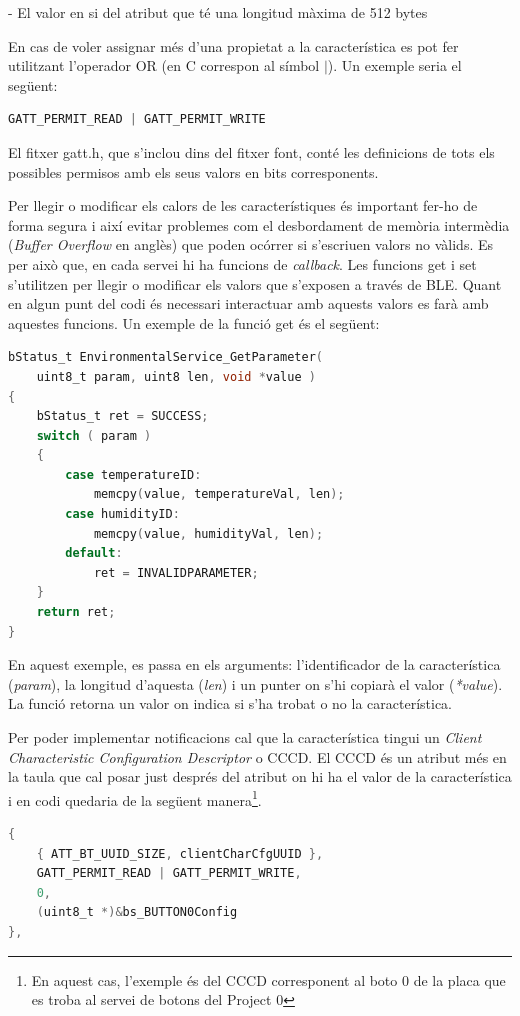 - El valor en si del atribut que té una longitud màxima de 512 bytes
\newline

En cas de voler assignar més d'una propietat a la característica es pot fer utilitzant l'operador OR (en C correspon al símbol $\mid$).
Un exemple seria el següent: 
\begin{lstlisting}[language=C]
GATT_PERMIT_READ | GATT_PERMIT_WRITE
\end{lstlisting}
El fitxer gatt.h, que s'inclou dins del fitxer font, conté les definicions de tots els possibles permisos amb els seus valors en bits corresponents.

Per llegir o modificar els calors de les característiques és important fer-ho de forma segura i així evitar problemes com el desbordament de memòria intermèdia (\textit{Buffer Overflow} en anglès) que poden ocórrer si s'escriuen valors no vàlids.
Es per això que, en cada servei hi ha funcions de \textit{callback}.
Les funcions get i set s'utilitzen per llegir o modificar els valors que s'exposen a través de BLE.
Quant en algun punt del codi és necessari interactuar amb aquests valors es farà amb aquestes funcions.
Un exemple de la funció get és el següent:

\begin{lstlisting}[language=C]
bStatus_t EnvironmentalService_GetParameter(
	uint8_t param, uint8 len, void *value )
{
	bStatus_t ret = SUCCESS;
	switch ( param )
	{
		case temperatureID:
			memcpy(value, temperatureVal, len);
		case humidityID:
			memcpy(value, humidityVal, len);
		default:
			ret = INVALIDPARAMETER;
	}
	return ret;
}
\end{lstlisting}

En aquest exemple, es passa en els arguments: l'identificador de la característica (\textit{param}), la longitud d'aquesta (\textit{len}) i un punter on s'hi copiarà el valor (\textit{*value}).
La funció retorna un valor on indica si s'ha trobat o no la característica.

Per poder implementar notificacions cal que la característica tingui un \textit{Client Characteristic Configuration Descriptor} o CCCD.
El CCCD és un atribut més en la taula que cal posar just després del atribut on hi ha el valor de la característica i en codi quedaria de la següent manera\footnote{En aquest cas, l'exemple és del CCCD corresponent al boto 0 de la placa que es troba al servei de botons del Project 0}.

\begin{lstlisting}[language=C]
{
	{ ATT_BT_UUID_SIZE, clientCharCfgUUID },
	GATT_PERMIT_READ | GATT_PERMIT_WRITE,
	0,
	(uint8_t *)&bs_BUTTON0Config
},
\end{lstlisting}

